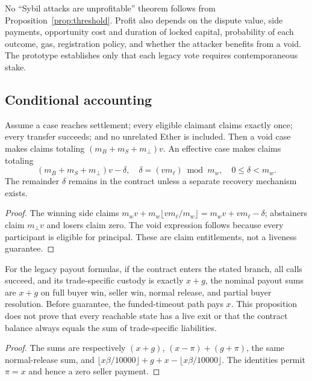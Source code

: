 No ``Sybil attacks are unprofitable'' theorem follows from Proposition~\ref{prop:threshold}. Profit
also depends on the dispute value, side payments, opportunity cost and duration of locked capital,
probability of each outcome, gas, registration policy, and whether the attacker benefits from a void.
The prototype establishes only that each legacy vote requires contemporaneous stake.

\subsection{Conditional accounting}
\label{sec:accounting}

\begin{proposition}
\label{prop:voting-accounting}
Assume a case reaches settlement; every eligible claimant claims exactly once; every transfer
succeeds; and no unrelated Ether is included. Then a void case makes claims totaling
$(m_B+m_S+m_\bot)v$. An effective case makes claims totaling
\[
 (m_B+m_S+m_\bot)v-\delta,
 \quad
 \delta=(v m_\ell)\bmod m_w,
 \quad 0\le\delta<m_w.
\]
The remainder $\delta$ remains in the contract unless a separate recovery mechanism exists.
\end{proposition}

\begin{proof}
The winning side claims
$m_wv+m_w\lfloor vm_\ell/m_w\rfloor=m_wv+vm_\ell-\delta$; abstainers claim
$m_\bot v$ and losers claim zero. The void expression follows because every participant is eligible
for principal. These are claim entitlements, not a liveness guarantee.
\end{proof}

\begin{proposition}
\label{prop:escrow-accounting}
For the legacy payout formulas, if the contract enters the stated branch, all calls succeed, and its
trade-specific custody is exactly $x+g$, the nominal payout sums are $x+g$ on full buyer win,
seller win, normal release, and partial buyer resolution. Before guarantee, the funded-timeout path
pays $x$. This proposition does not prove that every reachable state has a live exit or that the
contract balance always equals the sum of trade-specific liabilities.
\end{proposition}

\begin{proof}
The sums are respectively $(x+g)$, $(x-\pi)+(g+\pi)$, the same normal-release sum, and
$\lfloor x\beta/10000\rfloor+g+x-\lfloor x\beta/10000\rfloor$. The identities permit
$\pi=x$ and hence a zero seller payment.
\end{proof}

